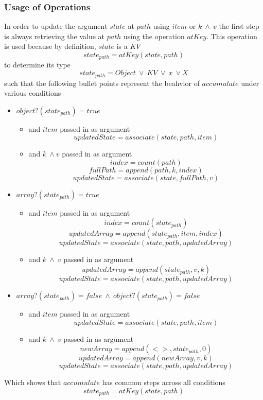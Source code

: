 \documentclass[../main.tex]{subfiles}
\begin{document}
\subsubsection{Usage of Operations}
In order to update the argument $state$ at $path$ using $item$ or $k \ \land \ v$ the first step is always retrieving the value at $path$ using the operation $atKey$. This operation is used because by definition, $state$ is a $KV$
$$state_{path} = atKey(state, path)$$
to determine its type
$$state_{path} = Object \ \lor \ KV \ \lor \ x \ \lor X$$
such that the following bullet points represent the beahvior of $accumulate$ under various conditions
\begin{itemize}
\item $object?(state_{path}) = true$
  \begin{itemize}
  \item and $item$ passed in as argument
    $$updatedState = associate(state, path, item)$$
  \item and $k \ \land v$ passed in as argument
    $$index = count(path)$$
    $$fullPath = append(path, k, index)$$
    $$updatedState = associate(state, fullPath, v)$$
  \end{itemize}
\item $array?(state_{path}) = true$
  \begin{itemize}
  \item and $item$ passed in as argument
    $$index = count(state_{path})$$
    $$updatedArray = append(state_{path}, item, index)$$
    $$updatedState = associate(state, path, updatedArray)$$
  \item and $k \ \land \ v$ passed in as argument
    $$updatedArray = append(state_{path}, v, k)$$
    $$updatedState = associate(state, path, updatedArray)$$
  \end{itemize}
\item $array?(state_{path}) = false \ \land \ object?(state_{path}) = false$
  \begin{itemize}
  \item and $item$ passed in as argument
    $$updatedState = associate(state, path, item)$$
  \item and $k \ \land \ v$ passed in as argument
    $$newArray = append(<>, state_{path}, 0)$$
    $$updatedArray = append(newArray, v, k)$$
    $$updatedState = associate(state, path, updatedArray)$$
  \end{itemize}
\end{itemize}
Which shows that $accumulate$ has common steps across all conditions
$$state_{path} = atKey(state, path)$$
\end{document}
